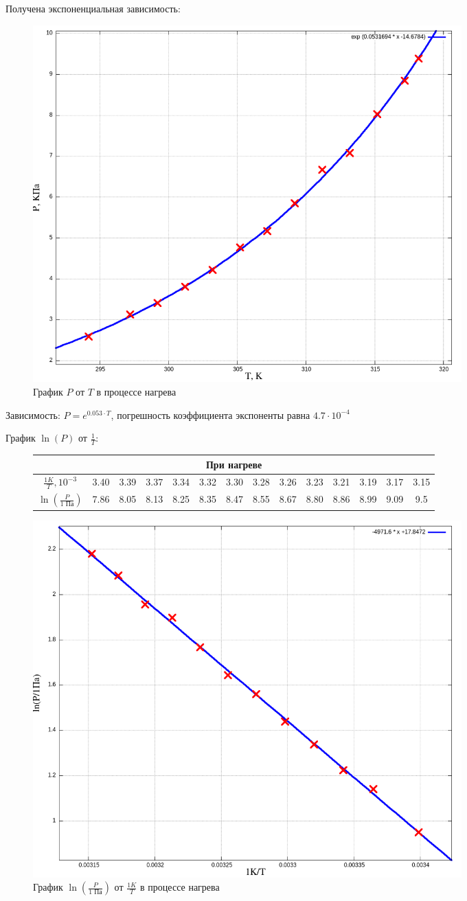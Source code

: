 \documentclass[a4paper,10pt]{article} %
\begin{document}
Получена экспоненциальная зависимость:


\begin{figure}[H]
	\centering
	\includegraphics[width=0.8\textwidth]{2-4-1-1-res.png}
	\caption{График $P$ от $T$ в процессе нагрева}
\end{figure}

Зависимость: $P = e^{0.053\cdot T}$, погрешность коэффициента экспоненты равна $4.7\cdot 10^{-4}$ 




График $\ln(P)$ от $\frac{1}{T}$:

\begin{figure}[H]
	\centering
	\begin{tabular}{|c|c|c|c|c|c|c|c|c|c|c|c|c|c|}
		\hline
		\multicolumn{14}{|c|}{При нагреве}\\
		\hline
		$\frac{1 K}{T}, 10^{-3}$&3.40&3.39&3.37&3.34&3.32&3.30&3.28&3.26&3.23&3.21&3.19&3.17&3.15\\\hline
		$\ln(\frac{P}{\text{1 Па}})$&7.86&8.05&8.13&8.25&8.35&8.47&8.55&8.67&8.80&8.86&8.99&9.09&9.5\\\hline
	\end{tabular}
\end{figure}



\begin{figure}[H]
	\centering
	\includegraphics[width=0.8\textwidth]{2-4-1-2-res.png}
	\caption{График $\ln \left(\frac{P}{\text{1 Па}}\right)$ от $\frac{1K}{T}$ в процессе нагрева}
\end{figure}
\end{document}

